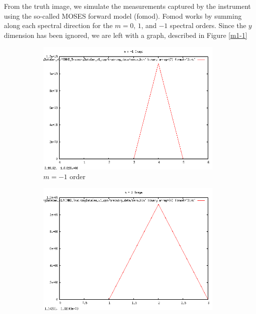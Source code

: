 \documentclass[twoside]{article}
\begin{document}
 From the truth image, we simulate the measurements captured by the instrument using the so-called MOSES forward model (fomod). Fomod works by summing along each spectral direction for the $m=0$, $1$, and $-1$ spectral orders. Since the $y$ dimension has been ignored, we are left with a graph, described in Figure \ref{m1-1}
 
 \begin{figure}
     \centering
     \begin{subfigure}[b]{0.3\textwidth}
         \includegraphics[width=\textwidth]{images/m-1}
         \caption{$m = -1$ order }
     \end{subfigure}
      \begin{subfigure}[b]{0.3\textwidth}
          \includegraphics[width=\textwidth]{images/m0}

\end{subfigure}
\end{figure}
\end{document}
